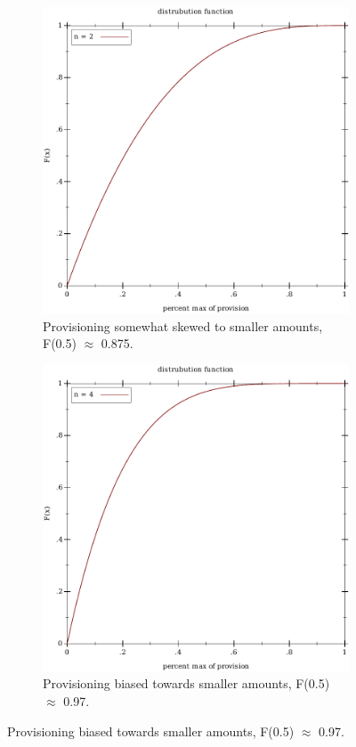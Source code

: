 \documentclass[12pt]{article} %
\begin{document}
    \begin{figure}[h!]
        \centering
        \begin{subfigure}[b]{0.3\textwidth}
            \centering
            \includegraphics[trim=6cm 0cm 4cm 0cm, scale=0.5]{plots/distribution_out_2.pdf}
            \caption{Provisioning somewhat skewed to smaller amounts, F(0.5) \(\approx\) 0.875.}
            \label{fig:first}
        \end{subfigure}
       \qquad \qquad  \qquad 
        \begin{subfigure}[b]{0.3\textwidth}
            \centering
            \includegraphics[trim=4cm 0cm 6cm 0cm, scale=0.5]{plots/distribution_out_4.pdf}
            \caption{Provisioning biased towards smaller amounts, F(0.5) \(\approx\) 0.97.}
            \label{fig:second}
        \end{subfigure}


\end{figure}
\end{document}
